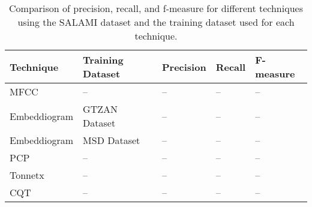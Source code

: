 
\begin{table}[h]
\centering
\begin{tabularx}{\textwidth}{|X|X|X|X|X|}
\hline
\textbf{Technique} & \textbf{Training Dataset} & \textbf{Precision} & \textbf{Recall} & \textbf{F-measure} \\
\hline
MFCC & -- & -- & -- & -- \\
\hline
Embeddiogram & GTZAN Dataset & -- & -- & -- \\
\hline
Embeddiogram & MSD Dataset & -- & -- & -- \\
\hline
PCP & -- & -- & -- & -- \\
\hline
Tonnetx & -- & -- & -- & -- \\
\hline
CQT & -- & -- & -- & -- \\
\hline
\end{tabularx}
\caption{Comparison of precision, recall, and f-measure for different techniques using the SALAMI dataset and the training dataset used for each technique.}
\label{tab:comparison}
\end{table}



